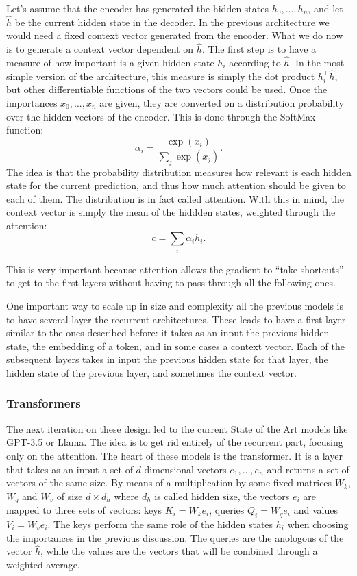 \documentclass[]{marticle}
\begin{document}
Let's assume that the encoder has generated the hidden states $h_0, \dots, h_n$, and let $\hat{h}$ be
the current hidden state in the decoder. In the previous architecture we would need a fixed context
vector generated from the encoder. What we do now is to generate a context vector dependent on
$\hat{h}$. The first step is to have a measure of how important is a given hidden state $h_i$
according to $\hat{h}$. In the most simple version of the architecture, this measure is simply the
dot product $h_i^\top \hat{h}$, but other differentiable functions of the two vectors could be used.
Once the importances $x_0, ..., x_n$ are given, they are converted on a distribution probability
over the hidden vectors of the encoder. This is done through the SoftMax function:
$$ \alpha_i = \frac{\exp (x_i)}{\sum_j \exp (x_j)}. $$ 
The idea is that the probability distribution measures how relevant is each hidden state for the
current prediction, and thus how much attention should be given to each of them. The distribution is
in fact called attention. With this in mind, the context vector is simply the mean of the hiddden
states, weighted through the attention:
$$ c = \sum_i \alpha_i h_i. $$

This is very important because attention allows the gradient to ``take shortcuts'' to get to the first
layers without having to pass through all the following ones.

One important way to scale up in size and complexity all the previous models is to have several
layer the recurrent architectures. These leads to have a first layer similar to the ones described
before: it takes as an input the previous hidden state, the embedding of a token, and in some cases
a context vector. Each of the subsequent layers takes in input the previous hidden state for that
layer, the hidden state of the previous layer, and sometimes the context vector.

\subsubsection{Transformers}

The next iteration on these design led to the current State of the Art models like GPT-3.5 or Llama.
The idea is to get rid entirely of the recurrent part, focusing only on the attention. The heart of
these models is the transformer. It is a layer that takes as an input a set of $d$-dimensional
vectors $e_1,..., e_n$ and returns a set of vectors of the same size. By means of a multiplication
by some fixed matrices $W_k$, $W_q$ and $W_v$ of size $d\times d_h$ where $d_h$ is called hidden
size, the vectors $e_i$ are mapped to three sets of vectors: keys $K_i = W_k e_i$, queries $Q_i =
W_q e_i$ and values $V_i = W_v e_i$. The keys perform the same role of the hidden states $h_i$ when
choosing the importances in the previous discussion. The queries are the anologous of the vector
$\hat{h}$, while the values are the vectors that will be combined through a weighted average.
\end{document}
